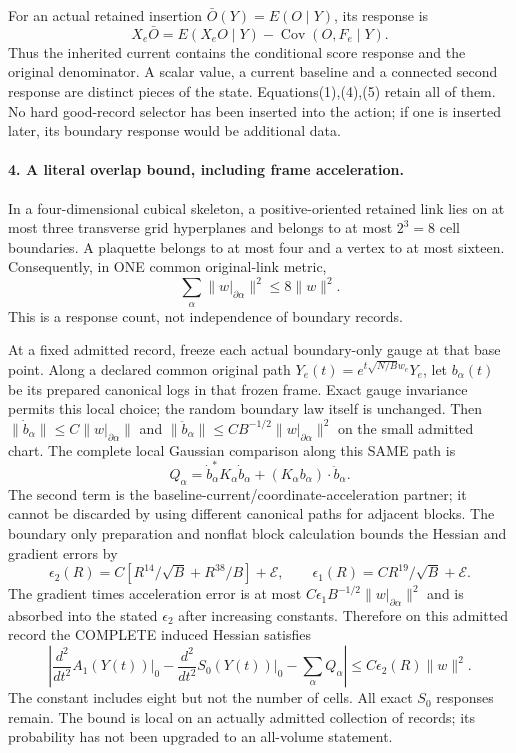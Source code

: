 \documentclass[11pt]{article}
\begin{document}
For an actual retained insertion $\bar O(Y)=E(O\mid Y)$, its response is
\[
 X_e\bar O=E(X_eO\mid Y)-\operatorname{Cov}(O,F_e\mid Y).                \tag{5}
\]
Thus the inherited current contains the conditional score response and the
original denominator. A scalar value, a current baseline and a connected
second response are distinct pieces of the state. Equations(1),(4),(5) retain
all of them. No hard good-record selector has been inserted into the action;
if one is inserted later, its boundary response would be additional data.

\paragraph{4. A literal overlap bound, including frame acceleration.}
In a four-dimensional cubical skeleton, a positive-oriented retained link
lies on at most three transverse grid hyperplanes and belongs to at most
$2^3=8$ cell boundaries. A plaquette belongs to at most four and a vertex to
at most sixteen. Consequently, in ONE common original-link metric,
\[
 \sum_\alpha\|w|_{\partial\alpha}\|^2\le8\|w\|^2.                      \tag{6}
\]
This is a response count, not independence of boundary records.

At a fixed admitted record, freeze each actual boundary-only gauge at that
base point. Along a declared common original path
$Y_e(t)=e^{t\sqrt{N/B}w_e}Y_e$, let $b_\alpha(t)$ be its prepared canonical
logs in that frozen frame. Exact gauge invariance permits this local choice;
the random boundary law itself is unchanged. Then
$\|\dot b_\alpha\|\le C\|w|_{\partial\alpha}\|$ and
$\|\ddot b_\alpha\|\le C B^{-1/2}\|w|_{\partial\alpha}\|^2$ on the small
admitted chart. The complete local Gaussian comparison along this SAME path is
\[
 Q_\alpha=\dot b_\alpha^*K_\alpha\dot b_\alpha
                  +(K_\alpha b_\alpha)\cdot\ddot b_\alpha.             \tag{7}
\]
The second term is the baseline-current/coordinate-acceleration partner; it
cannot be discarded by using different canonical paths for adjacent blocks.
The boundary only preparation and nonflat block calculation bounds the Hessian and gradient errors by
\[
 \epsilon_2(R)=C[R^{14}/\sqrt B+R^{38}/B]+\mathcal E,
 \qquad \epsilon_1(R)=CR^{19}/\sqrt B+\mathcal E.
\]
The gradient times acceleration error is at most
$C\epsilon_1 B^{-1/2}\|w|_{\partial\alpha}\|^2$ and is absorbed into the
stated $\epsilon_2$ after increasing constants. Therefore on this admitted
record the COMPLETE induced Hessian satisfies
\[
 \left|\frac{d^2}{dt^2}A_1(Y(t))\big|_0
       -\frac{d^2}{dt^2}S_0(Y(t))\big|_0-\sum_\alpha Q_\alpha\right|
 \le C\epsilon_2(R)\|w\|^2.                                           \tag{8}
\]
The constant includes eight but not the number of cells. All exact $S_0$
responses remain. The bound is local on an actually admitted collection of
records; its probability has not been upgraded to an all-volume statement.
\end{document}
